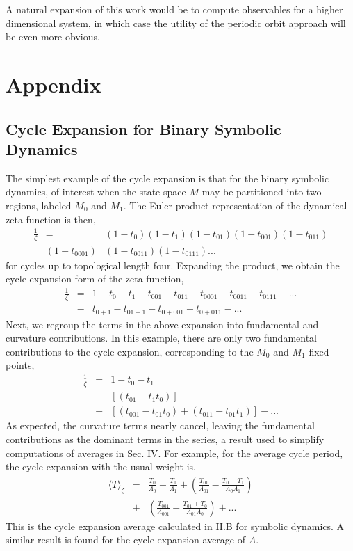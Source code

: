 \documentclass[twocolumn,aip,cha]{revtex4-1}
\begin{document}
\indent A natural expansion of this work would be to compute observables for a higher dimensional system, in which case the utility of the periodic orbit approach will be even more obvious.
\newpage
\section{Appendix}
\subsection{Cycle Expansion for Binary Symbolic Dynamics}
The simplest example of the cycle expansion is that for the binary symbolic dynamics, of interest when the state space $M$ may be partitioned into two regions, labeled $M_{0}$ and $M_{1}$. The Euler product representation of the dynamical zeta function is then,
\begin{eqnarray*}
\frac{1}{\zeta} &=& (1 - t_{0})(1-t_{1})(1-t_{01})(1-t_{001})(1-t_{011})
\\ &(1-t_{0001})&(1-t_{0011})(1-t_{0111})...
\end{eqnarray*}
for cycles up to topological length four. Expanding the product, we obtain the cycle expansion form of the zeta function,
\begin{eqnarray*}
\frac{1}{\zeta} &=& 1 - t_{0} - t_{1} - t_{001} - t_{011} - t_{0001} - t_{0011} - t_{0111} - ...
\\ &-& t_{0+1} - t_{01+1} - t_{0+001} - t_{0+011} - ...
\end{eqnarray*}
Next, we regroup the terms in the above expansion into fundamental and curvature contributions. In this example, there are only two fundamental contributions to the cycle expansion, corresponding to the $M_{0}$ and $M_{1}$ fixed points,
\begin{eqnarray*}
\frac{1}{\zeta} &=& 1 - t_{0} - t_{1} \\ &-& [(t_{01} - t_{1}t_{0})] \\ &-& [(t_{001} - t_{01}t_{0}) + (t_{011} - t_{01}t_{1})] - ...
\end{eqnarray*}
As expected, the curvature terms nearly cancel, leaving the fundamental contributions as the dominant terms in the series, a result used to simplify computations of averages in Sec. IV. For example, for the average cycle period, the cycle expansion with the usual weight is,
\begin{eqnarray*}
\langle T \rangle_{\zeta} &=& \frac{T_{0}}{\Lambda_{0}} + \frac{T_{1}}{\Lambda_{1}} + \left( \frac{T_{01}}{\Lambda_{01}}-\frac{T_{0} + T_{1}}{\Lambda_{0}\Lambda_{1}}\right)
\\ &+& \left( \frac{T_{001}}{\Lambda_{001}}-\frac{T_{01} + T_{0}}{\Lambda_{01}\Lambda_{0}}\right) +...
\end{eqnarray*}
This is the cycle expansion average calculated in II.B for symbolic dynamics. A similar result is found for the cycle expansion average of $A$.
\end{document}
